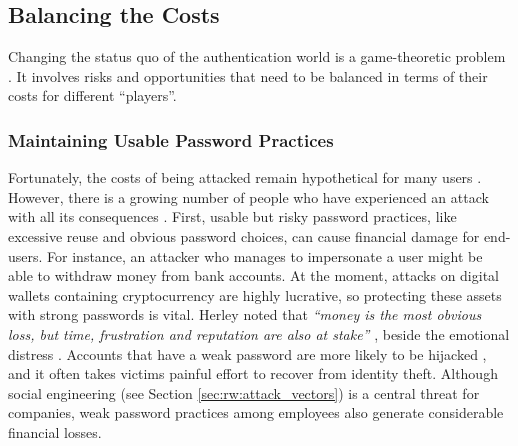 \subsection{Balancing the Costs}
Changing the status quo of the authentication world is a game-theoretic problem \cite{Bonneau2015ImperfectAuthentication}. It involves risks and opportunities that need to be balanced in terms of their costs for different ``players''. 

\subsubsection{Maintaining Usable Password Practices}
Fortunately, the costs of being attacked remain hypothetical for many users \cite{Herley2015Counterfactuals}. However, there is a growing number of people who have experienced an attack with all its consequences \cite{BKA2016Bundeslagebild}. 
First, usable but risky password practices, like excessive reuse and obvious password choices, can cause financial damage for end-users. For instance, an attacker who manages to impersonate a user might be able to withdraw money from bank accounts. At the moment, attacks on digital wallets containing cryptocurrency are highly lucrative, so protecting these assets with strong passwords is vital. 
Herley \etal noted that \textit{``money is the most obvious loss, but time, frustration and reputation are also at stake''} \cite{Herley2012PersistenceOfPasswords}, beside the emotional distress \cite{Shay2014ReligiousAunt}. Accounts that have a weak password are more likely to be hijacked \cite{Wang2016TargetedGuessingUnderestimated}, and it often takes victims painful effort to recover from identity theft. Although social engineering (see Section \ref{sec:rw:attack_vectors}) is a central threat for companies, weak password practices among employees also generate considerable financial losses. 

